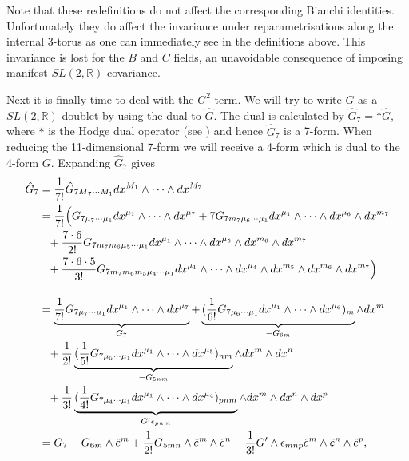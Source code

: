 Note that these redefinitions do not affect the corresponding Bianchi identities.
Unfortunately they do affect the invariance under reparametrisations along the internal 3-torus as one can immediately see in the definitions above.
This invariance is lost for the $B$ and $C$ fields, an unavoidable consequence of imposing manifest $SL(2,{\mathbb R})$ covariance.

Next it is finally time to deal with the $G^2$ term. We will try to write $G$ as a $SL(2,{\mathbb R})$ doublet by using the dual to $\hat{G}$.
The dual is calculated by $\hat{G}_7=*\hat{G}$, where $*$ is the Hodge dual operator (see ) and hence $\hat{G}_7$ is a 7-form.
When reducing the 11-dimensional 7-form we will receive a 4-form which is dual to the 4-form $G$. Expanding $\hat{G}_7$ gives
\begin{align}
\hat{G}_7 &= {1 \over 7!} \hat{G}_{7M{_7} \cdots M_{1}} dx^{M_{1}} \wedge \cdots \wedge dx^{M_{7}} \nonumber \\
&={1 \over 7!}\Big{(}G_{7 {\mu}_7 \cdots {\mu}_1} dx^{{\mu}_{1}} \wedge \cdots \wedge dx^{{\mu}_{7}} + 7G_{7 m_7 {\mu}_6 \cdots {\mu}_1} dx^{{\mu}_{1}} \wedge \cdots \wedge dx^{{\mu}_{6}} \wedge dx^{m_7} \nonumber \\
&\phantom{=} +{7 \cdot 6 \over 2!}G_{7 m_7 m_6 {\mu}_5 \cdots {\mu}_1}dx^{{\mu}_{1}} \wedge \cdots \wedge dx^{{\mu}_{5}} \wedge dx^{m_6} \wedge dx^{m_7} \nonumber \\
&\phantom{=} +{7 \cdot 6 \cdot 5 \over 3!}G_{7 m_7 m_6 m_5 {\mu}_4 \cdots {\mu}_1}dx^{{\mu}_{1}} \wedge \cdots \wedge dx^{{\mu}_{4}} \wedge dx^{m_5} \wedge dx^{m_6} \wedge dx^{m_7} \Big{)} \nonumber \\
\intertext{}
&= \underbrace{{1 \over 7!}G_{7 {\mu}_7 \cdots {\mu}_1} dx^{{\mu}_{1}} \wedge \cdots \wedge dx^{{\mu}_{7}}}_{G_7} + \underbrace{({1 \over 6!}G_{7{\mu}_6 \cdots {\mu}_1} dx^{{\mu}_{1}} \wedge \cdots \wedge dx^{{\mu}_{6}})_{m}}_{-G_{6m}} \wedge dx^m \nonumber \\
&\phantom{=} +{1 \over 2!} \underbrace{({1 \over 5!}G_{7{\mu}_5 \cdots {\mu}_1} dx^{{\mu}_{1}} \wedge \cdots \wedge dx^{{\mu}_{5}})_{nm}}_{-G_{5nm}} \wedge dx^m \wedge dx^n \nonumber \\
&\phantom{=} +{1 \over 3!} \underbrace{({1 \over 4!}G_{7{\mu}_4 \cdots {\mu}_1}dx^{{\mu}_{1}} \wedge \cdots \wedge dx^{{\mu}_{4}})_{pnm}}_{G'{\epsilon}_{pnm}} \wedge dx^m \wedge dx^n  \wedge dx^p \nonumber \\
&= G_7 - G_{6m} \wedge \hat{e}^m + {1 \over 2!} G_{5mn} \wedge \hat{e}^m \wedge \hat{e}^n - {1 \over 3!}G' \wedge {\epsilon}_{mnp} \hat{e}^m \wedge \hat{e}^n \wedge \hat{e}^p,
\label{g7}
\end{align}
